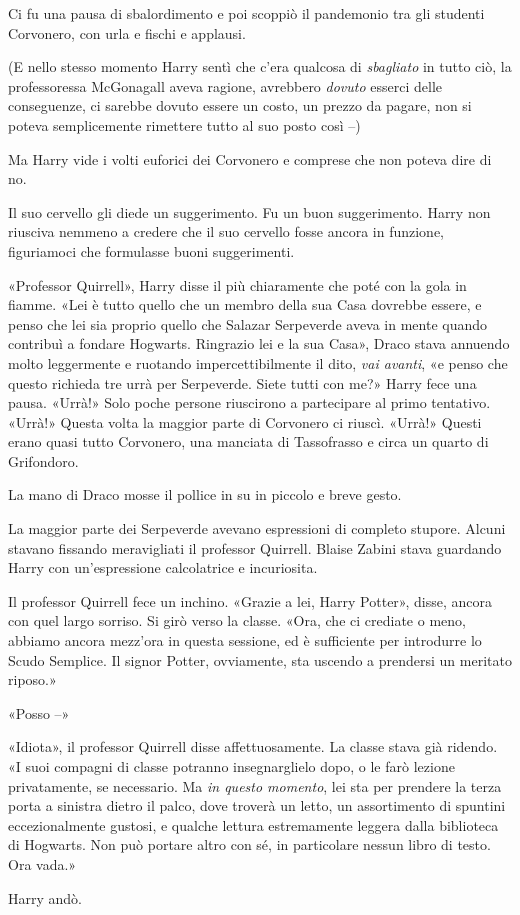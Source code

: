 Ci fu una pausa di sbalordimento e poi scoppiò il pandemonio tra gli studenti Corvonero, con urla e fischi e applausi.

(E nello stesso momento Harry sentì che c’era qualcosa di \textit{sbagliato} in tutto ciò, la professoressa McGonagall aveva ragione, avrebbero \textit{dovuto} esserci delle conseguenze, ci sarebbe dovuto essere un costo, un prezzo da pagare, non si poteva semplicemente rimettere tutto al suo posto così –)

Ma Harry vide i volti euforici dei Corvonero e comprese che non poteva dire di no.

Il suo cervello gli diede un suggerimento. Fu un buon suggerimento. Harry non riusciva nemmeno a credere che il suo cervello fosse ancora in funzione, figuriamoci che formulasse buoni suggerimenti.

«Professor Quirrell», Harry disse il più chiaramente che poté con la gola in fiamme. «Lei è tutto quello che un membro della sua Casa dovrebbe essere, e penso che lei sia proprio quello che Salazar Serpeverde aveva in mente quando contribuì a fondare Hogwarts. Ringrazio lei e la sua Casa», Draco stava annuendo molto leggermente e ruotando impercettibilmente il dito, \textit{vai avanti}, «e penso che questo richieda tre urrà per Serpeverde. Siete tutti con me?» Harry fece una pausa. «Urrà!» Solo poche persone riuscirono a partecipare al primo tentativo. «Urrà!» Questa volta la maggior parte di Corvonero ci riuscì. «Urrà!» Questi erano quasi tutto Corvonero, una manciata di Tassofrasso e circa un quarto di Grifondoro.

La mano di Draco mosse il pollice in su in piccolo e breve gesto.

La maggior parte dei Serpeverde avevano espressioni di completo stupore. Alcuni stavano fissando meravigliati il professor Quirrell. Blaise Zabini stava guardando Harry con un’espressione calcolatrice e incuriosita.

Il professor Quirrell fece un inchino. «Grazie a lei, Harry Potter», disse, ancora con quel largo sorriso. Si girò verso la classe. «Ora, che ci crediate o meno, abbiamo ancora mezz’ora in questa sessione, ed è sufficiente per introdurre lo Scudo Semplice. Il signor Potter, ovviamente, sta uscendo a prendersi un meritato riposo.»

«Posso –»

«Idiota», il professor Quirrell disse affettuosamente. La classe stava già ridendo. «I suoi compagni di classe potranno insegnarglielo dopo, o le farò lezione privatamente, se necessario. Ma \textit{in questo momento}, lei sta per prendere la terza porta a sinistra dietro il palco, dove troverà un letto, un assortimento di spuntini eccezionalmente gustosi, e qualche lettura estremamente leggera dalla biblioteca di Hogwarts. Non può portare altro con sé, in particolare nessun libro di testo. Ora vada.»

Harry andò.



